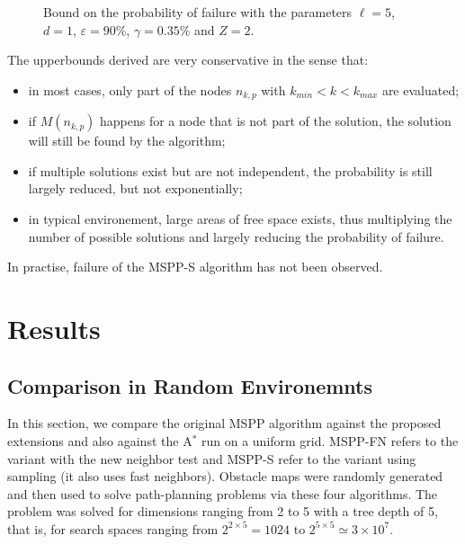 \documentclass[letterpaper, 10 pt, conference]{ieeeconf}
\theoremstyle{definition}
\begin{document}
\begin{figure}
\caption{Bound on the probability of failure with the parameters $\ell=5$, $d=1$, $\varepsilon=90\%$, $\gamma=0.35\%$ and $Z=2$.}
\label{fig:prob_bound}
\end{figure}

The upperbounds derived are very conservative in the sense that:
\begin{itemize}
\item in most cases, only part of the nodes $n_{k,p}$ with $k_{min}< k < k_{max}$ are evaluated;
\item if $M(n_{k,p})$ happens for a node that is not part of the solution, the solution will still be found by the algorithm;
\item if multiple solutions exist but are not independent, the probability is still largely reduced, but not exponentially;
\item in typical environement, large areas of free space exists, thus multiplying the number of possible solutions and largely reducing the probability of failure.
\end{itemize}  
In practise, failure of the MSPP-S algorithm has not been observed.


\section{Results}

\subsection{Comparison in Random Environemnts}

In this section, we compare the original MSPP algorithm against the proposed extensions and also against the A$^*$ run on a uniform grid.
MSPP-FN refers to the variant with the new neighbor test and MSPP-S refer to the variant using sampling (it also uses fast neighbors).
Obstacle maps were randomly generated and then used to solve path-planning problems via these four algorithms.
The problem was solved for dimensions ranging from 2 to 5 with a tree depth of 5, that is, for search spaces ranging from $2^{2 \times 5}=1024$ to $2^{5\times 5}\simeq 3\times 10^7$.
\end{document}
